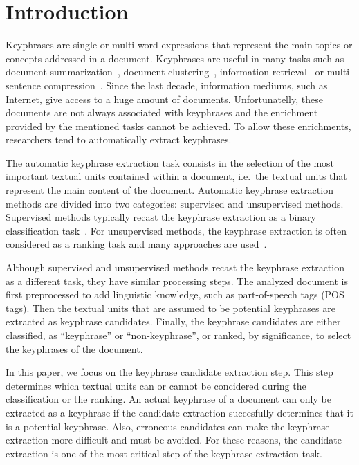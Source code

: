 \section{Introduction}
\label{sec:section}
  Keyphrases are single or multi-word expressions that represent the main topics
  or concepts addressed in a document. Keyphrases are useful in many tasks such
  as document summarization~\cite{avanzo2005keyphrase}, document
  clustering~\cite{han2007webdocumentclustering}, information
  retrieval~\cite{medelyan2008smalltrainingset} or multi-sentence
  compression~\cite{boudin2013multisentencecompression}.
  Since the last decade, information mediums, such as Internet, give access to a
  huge amount of documents. Unfortunatelly, these documents are not always
  associated with keyphrases and the enrichment provided by the mentioned tasks
  cannot be achieved. To allow these enrichments, researchers tend to
  automatically extract keyphrases.

  The automatic keyphrase extraction task consists in the selection of the most
  important textual units contained within a document, i.e.~the textual units
  that represent the main content of the document. Automatic keyphrase
  extraction methods are divided into two categories: supervised and
  unsupervised methods. Supervised methods typically recast the keyphrase
  extraction as a binary classification task~\cite{witten1999kea}. For
  unsupervised methods, the keyphrase extraction is often considered as a
  ranking task and many approaches are
  used~\cite{barker2000nounphrasehead,mihalcea2004textrank,ding2011binaryintegerprogramming}.

  Although supervised and unsupervised methods recast the keyphrase extraction
  as a different task, they have similar processing steps. The analyzed document
  is first preprocessed to add linguistic knowledge, such as part-of-speech tags
  (POS tags). Then the textual units that are assumed to be potential keyphrases
  are extracted as keyphrase candidates. Finally, the keyphrase candidates are
  either classified, as ``keyphrase'' or ``non-keyphrase'', or ranked, by
  significance, to select the keyphrases of the document.
  
  In this paper, we focus on the keyphrase candidate extraction step. This step
  determines which textual units can or cannot be concidered during the
  classification or the ranking. An actual keyphrase of a document can only be
  extracted as a keyphrase if the candidate extraction succesfully determines
  that it is a potential keyphrase. Also, erroneous candidates can make the
  keyphrase extraction more difficult and must be avoided. For these reasons,
  the candidate extraction is one of the most critical step of the keyphrase
  extraction task.

